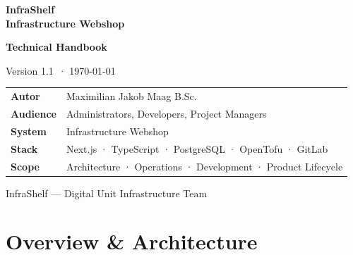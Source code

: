 \documentclass[12pt,a4paper,twoside]{report}
\newcommand{\docversion}{1.1}
\newcommand{\docdate}{\today}
\begin{document}
\begin{titlepage}

  \vspace*{2.5cm}

  {\color{white}\fontsize{28}{34}\selectfont\bfseries
    InfraShelf\\[6pt]
    Infrastructure Webshop}

  \vspace{2.2cm}

  {\fontsize{22}{28}\selectfont\bfseries Technical Handbook}

  \vspace{0.4cm}
  {\large\color{gray!60!black} Version \docversion\ · \docdate}

  \vfill

  \begin{tabular}{@{}ll}
    \toprule
    \textbf{Autor}     & Maximilian Jakob Maag B.Sc. \\
    \textbf{Audience}  & Administrators, Developers, Project Managers \\
    \textbf{System}    & Infrastructure Webshop \\
    \textbf{Stack}     & Next.js · TypeScript · PostgreSQL · OpenTofu · GitLab \\
    \textbf{Scope}     & Architecture · Operations · Development · Product Lifecycle \\
    \bottomrule
  \end{tabular}

  \vspace{1cm}
  {\small\color{gray}InfraShelf — Digital Unit Infrastructure Team}
\end{titlepage}

\tableofcontents
\listoffigures
\listoftables
\lstlistoflistings

\part{Overview \& Architecture}
\label{part:arch}
\end{document}
